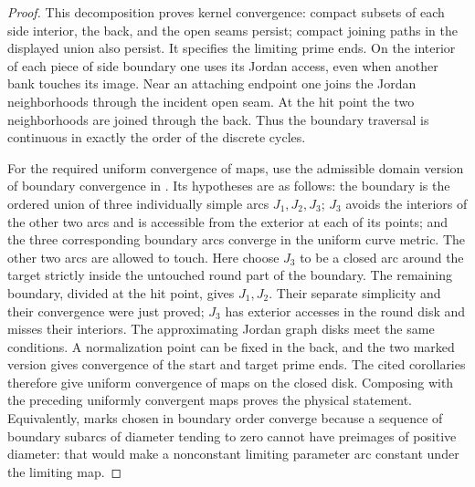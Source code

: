 \begin{proof}
This decomposition proves kernel convergence: compact subsets of
each side interior, the back, and the open seams persist; compact
joining paths in the displayed union also persist.  It specifies
the limiting prime ends.  On the interior of each piece of side
boundary one uses its Jordan access, even when another bank touches
its image.  Near an attaching endpoint one joins the Jordan
neighborhoods through the incident open seam.  At the hit point
the two neighborhoods are joined through the back.  Thus the
boundary traversal is continuous in exactly the order of the
discrete cycles.

For the required uniform convergence of maps, use the admissible
domain version of boundary convergence in
\cite[Lemma~A.1 and Corollaries~A.1--A.2]{cnexploration}.
Its hypotheses are as follows: the boundary is the ordered union
of three individually simple arcs $J_1,J_2,J_3$; $J_3$ avoids the
interiors of the other two arcs and is accessible from the
exterior at each of its points; and the three corresponding
boundary arcs converge in the uniform curve metric.  The other
two arcs are allowed to touch.  Here choose $J_3$ to be a closed
arc around the target strictly inside the untouched round part of
the boundary.  The remaining boundary, divided at the hit point,
gives $J_1,J_2$.  Their separate simplicity and their convergence
were just proved; $J_3$ has exterior accesses in the round disk
and misses their interiors.  The approximating Jordan graph disks
meet the same conditions.  A normalization point can be fixed in
the back, and the two marked version gives convergence of the
start and target prime ends.  The cited corollaries therefore give
uniform convergence of maps on the closed disk.  Composing with
the preceding uniformly convergent maps proves the physical
statement.  Equivalently, marks chosen in boundary order converge
because a sequence of boundary subarcs of diameter tending to zero
cannot have preimages of positive diameter: that would make a
nonconstant limiting parameter arc constant under the limiting
map.
\end{proof}

